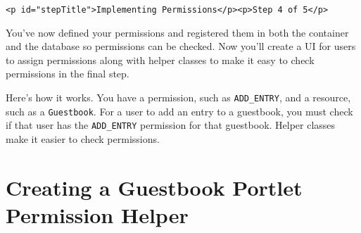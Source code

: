 \begin{verbatim}
<p id="stepTitle">Implementing Permissions</p><p>Step 4 of 5</p>
\end{verbatim}

You've now defined your permissions and registered them in both the
container and the database so permissions can be checked. Now you'll
create a UI for users to assign permissions along with helper classes to
make it easy to check permissions in the final step.

Here's how it works. You have a permission, such as \texttt{ADD\_ENTRY},
and a resource, such as a \texttt{Guestbook}. For a user to add an entry
to a guestbook, you must check if that user has the \texttt{ADD\_ENTRY}
permission for that guestbook. Helper classes make it easier to check
permissions.

\section{Creating a Guestbook Portlet Permission
Helper}\label{creating-a-guestbook-portlet-permission-helper}

